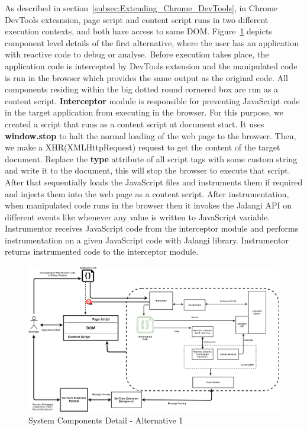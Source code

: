 As described in section~\ref{subsec:Extending_Chrome_DevTools}, in Chrome DevTools extesnsion, page script and content script runs in two different execution contexts, and both have access to same DOM.
Figure~\ref{fig:system_implementation_detail_1} depicts component level details of the first alternative, where the user has an application with reactive
code to debug or analyse. Before execution takes place, the application code is intercepted by DevTools extension and the manipulated code is run in the browser which provides the same output as the original code.
All components residing within the big dotted round cornered box are run as a content script. \textbf{Interceptor} module is responsible for preventing JavaScript code in the target application from executing in the browser. For this purpose, we created a script that runs as a content script at document start. It uses \textbf{window.stop} to halt the normal loading of the web page to the browser. 
Then, we make a XHR(XMLHttpRequest) request to get the content of the target document. Replace the \textbf{type} attribute of all script tags with some custom string and write it to the document, this will stop the browser to execute that script. After that sequentially loads the JavaScript files and instruments them if required and injects them into the web page as a content script.
After instrumentation, when manipulated code runs in the browser then it invokes the Jalangi API on
different events like whenever any value is written to JavaScript variable.
Instrumentor receives JavaScript code from the interceptor module and performs instrumentation on a given JavaScript code with Jalangi library. Instrumentor returns instrumented code to the interceptor module. 


\begin{figure}[!h]
	\centering
	\includegraphics[width=\textwidth,height=\textheight,keepaspectratio]{gfx/SystemFlowDiagramDesign1.png}
	\caption{System Components Detail - Alternative 1}
	\label{fig:system_implementation_detail_1}
\end{figure}


